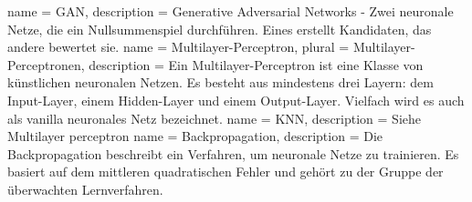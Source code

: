  {
    name = {GAN},
    description = {Generative Adversarial Networks - Zwei neuronale Netze, die ein Nullsummenspiel durchführen.
    Eines erstellt Kandidaten, das andere bewertet sie.\cite{wiki:gan}}
}
 {
    name = {Multilayer-Perceptron},
    plural = {Multilayer-Perceptronen},
    description = {Ein Multilayer-Perceptron ist eine Klasse von künstlichen neuronalen Netzen. Es besteht aus mindestens
    drei Layern: dem Input-Layer, einem Hidden-Layer und einem Output-Layer. Vielfach wird es auch als \glqq vanilla\grqq{}
        neuronales Netz bezeichnet.\cite{wiki:multilayerPerceptron}}
}
 {
    name = {KNN},
    description = {Siehe \Gls{Multilayer perceptron}}
}
 {
    name = {Backpropagation},
    description = {Die Backpropagation beschreibt ein Verfahren, um neuronale Netze zu trainieren. Es basiert auf dem
    mittleren quadratischen Fehler und gehört zu der Gruppe der überwachten Lernverfahren.\cite{wiki:backpropagation}}
}
